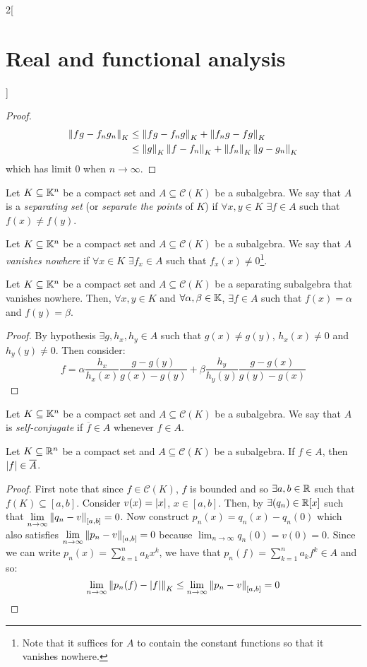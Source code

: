 \documentclass[../../../main_math.tex]{subfiles}
\begin{document}
\begin{multicols}{2}[\section{Real and functional analysis}]
\begin{proof}
\begin{align*}
      \left\|fg-f_ng_n\right\|_K & \leq \left\|fg-f_ng\right\|_K+\left\|f_ng-fg\right\|_K                  \\
                         & \leq\left\|g\right\|_K\left\|f-f_n\right\|_K+\left\|f_n\right\|_K\left\|g-g_n\right\|_K
    \end{align*}
    which has limit 0 when $n\to\infty$.
  \end{proof}
  \begin{definition}
    Let $K\subseteq \mathbb{K}^n$ be a compact set and $A\subseteq \mathcal{C}(K)$ be a subalgebra. We say that $A$ is a \emph{separating set} (or \emph{separate the points} of $K$) if $\forall x,y\in K$ $\exists f\in A$ such that $f(x)\ne f(y)$.
  \end{definition}
  \begin{definition}
    Let $K\subseteq \mathbb{K}^n$ be a compact set and $A\subseteq \mathcal{C}(K)$ be a subalgebra. We say that $A$ \emph{vanishes nowhere} if $\forall x\in K$ $\exists f_x\in A$ such that $f_x(x)\ne 0$\footnote{Note that it suffices for $A$ to contain the constant functions so that it vanishes nowhere.}.
  \end{definition}
  \begin{lemma}\label{RFA:lemmaalphabeta}
    Let $K\subseteq \mathbb{K}^n$ be a compact set and $A\subseteq \mathcal{C}(K)$ be a separating subalgebra that vanishes nowhere. Then, $\forall x,y\in K$ and $\forall \alpha,\beta\in\mathbb{K}$, $\exists f\in A$ such that $f(x)=\alpha$ and $f(y)=\beta$.
  \end{lemma}
  \begin{proof}
    By hypothesis $\exists g,h_x,h_y\in A$ such that $g(x)\ne g(y)$, $h_x(x)\ne 0$ and $h_y(y)\ne 0$. Then consider:
    $$f=\alpha\frac{h_x}{h_x(x)}\frac{g-g(y)}{g(x)-g(y)}+\beta\frac{h_y}{h_y(y)}\frac{g-g(x)}{g(y)-g(x)}$$
  \end{proof}
  \begin{definition}
    Let $K\subseteq \mathbb{K}^n$ be a compact set and $A\subseteq \mathcal{C}(K)$ be a subalgebra. We say that $A$ is \emph{self-conjugate} if $\overline{f}\in A$ whenever $f\in A$.
  \end{definition}
  \begin{lemma}
    Let $K\subseteq \mathbb{R}^n$ be a compact set and $A\subseteq \mathcal{C}(K)$ be a subalgebra. If $f\in A$, then $\abs{f}\in \overline{A}$.
  \end{lemma}
  \begin{proof}
    First note that since $f\in \mathcal{C}(K)$, $f$ is bounded and so $\exists a,b\in\mathbb{R}$ such that $f(K)\subseteq[a,b]$. Consider $v(x)=\abs{x}$, $x\in[a,b]$. Then, by  $\exists (q_n)\in\mathbb{R}[x]$ such that $\displaystyle\lim_{n\to\infty}\left\|q_n-v\right\|_{[a,b]}=0$. Now construct $p_n(x)=q_n(x)-q_n(0)$ which also satisfies $\displaystyle\lim_{n\to\infty}\left\|p_n-v\right\|_{[a,b]}=0$ because $\displaystyle\lim_{n\to\infty} q_n(0)=v(0)=0$. Since we can write $p_n(x)=\sum_{k=1}^na_kx^k$, we have that $p_n(f)=\sum_{k=1}^na_kf^k\in A$ and so: $$\lim_{n\to\infty}\left\|p_n(f)-\abs{f}\right\|_{K}\leq\lim_{n\to\infty}\left\|p_n-v\right\|_{[a,b]}=0$$

\end{proof}
\end{multicols}
\end{document}
